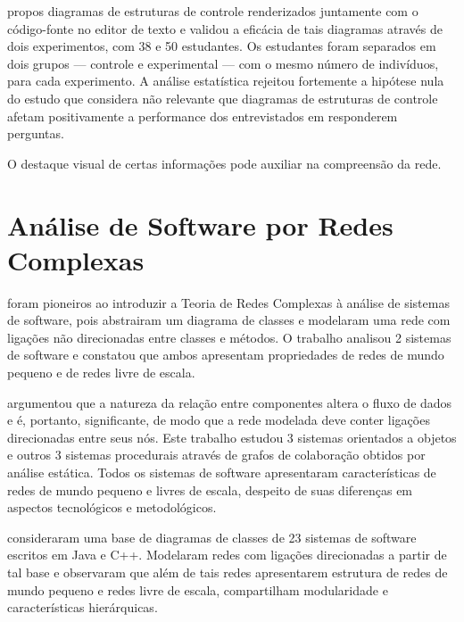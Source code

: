  propos diagramas de
estruturas de controle renderizados juntamente com o código-fonte no editor de
texto e validou a eficácia de tais diagramas através de dois experimentos, com
38 e 50 estudantes.
Os estudantes foram separados em dois grupos --- controle e experimental --- com
o mesmo número de indivíduos, para cada experimento.
A análise estatística rejeitou fortemente a hipótese nula do estudo que
considera não relevante que diagramas de estruturas de controle afetam
positivamente a performance dos entrevistados em responderem perguntas.

O destaque visual de certas informações pode auxiliar na compreensão da rede.



\section{Análise de Software por Redes Complexas}
\label{sec:SoftwareComplexNetworks}

 foram pioneiros ao introduzir a Teoria de
Redes Complexas à análise de sistemas de software, pois abstrairam um diagrama
de classes e modelaram uma rede com ligações não direcionadas entre classes e
métodos. O trabalho analisou 2 sistemas de software e constatou que ambos
apresentam propriedades de redes de mundo pequeno e de redes livre de escala.

 argumentou que a natureza da relação entre
componentes altera o fluxo de dados e é, portanto, significante, de modo que a
rede modelada deve conter ligações direcionadas entre seus nós. Este trabalho
estudou 3 sistemas orientados a objetos e outros 3 sistemas procedurais através
de grafos de colaboração obtidos por análise estática. Todos os sistemas de
software apresentaram características de redes de mundo pequeno e livres de
escala, despeito de suas diferenças em aspectos tecnológicos e metodológicos.

 consideraram uma base de diagramas de classes
de 23 sistemas de software escritos em Java e C++. Modelaram redes com ligações
direcionadas a partir de tal base e observaram que além de tais redes
apresentarem estrutura de redes de mundo pequeno e redes livre de escala,
compartilham modularidade e características hierárquicas.

